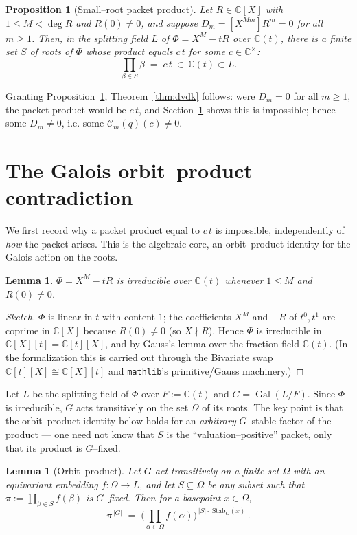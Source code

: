 \documentclass[11pt,reqno]{amsart}
\theoremstyle{plain}
\newtheorem{lemma}[theorem]{Lemma}
\newtheorem{proposition}[theorem]{Proposition}
\theoremstyle{definition}
\newcommand{\C}{\mathbb{C}}
\newcommand{\Gal}{\operatorname{Gal}}
\begin{document}
\begin{proposition}[Small--root packet product]\label{prop:crux}
Let $R\in\C[X]$ with $1\le M<\deg R$ and $R(0)\ne0$, and suppose $D_m=[X^{Mm}]R^m=0$ for all $m\ge1$.
Then, in the splitting field $L$ of $\Phi=X^M-tR$ over $\C(t)$, there is a finite set $S$ of roots of
$\Phi$ whose product equals $c\,t$ for some $c\in\C^\times$:
\[
  \prod_{\beta\in S}\beta \;=\; c\,t\ \in\ \C(t)\subset L.
\]
\end{proposition}

Granting Proposition~\ref{prop:crux}, Theorem~\ref{thm:dvdk} follows: were $D_m=0$ for all $m\ge1$, the
packet product would be $c\,t$, and Section~\ref{sec:orbit} shows this is impossible; hence some
$D_m\ne0$, i.e. some $\mathcal C_m(q)(c)\ne0$.

\section{The Galois orbit--product contradiction}\label{sec:orbit}

We first record why a packet product equal to $c\,t$ is impossible, independently of \emph{how} the
packet arises. This is the algebraic core, an orbit--product identity for the Galois action on the
roots.

\begin{lemma}\label{lem:irred}
$\Phi=X^M-tR$ is irreducible over $\C(t)$ whenever $1\le M$ and $R(0)\ne0$.
\end{lemma}

\begin{proof}[Sketch]
$\Phi$ is linear in $t$ with content $1$; the coefficients $X^M$ and $-R$ of $t^0,t^1$ are coprime in
$\C[X]$ because $R(0)\ne0$ (so $X\nmid R$). Hence $\Phi$ is irreducible in $\C[X][t]=\C[t][X]$, and by
Gauss's lemma over the fraction field $\C(t)$. (In the formalization this is carried out through the
Bivariate swap $\C[t][X]\cong\C[X][t]$ and \texttt{mathlib}'s primitive/Gauss machinery.)
\end{proof}

Let $L$ be the splitting field of $\Phi$ over $F:=\C(t)$ and $G=\Gal(L/F)$. Since $\Phi$ is irreducible,
$G$ acts transitively on the set $\Omega$ of its roots. The key point is that the orbit--product
identity below holds for an \emph{arbitrary} $G$--stable factor of the product --- one need not know
that $S$ is the ``valuation--positive'' packet, only that its product is $G$--fixed.

\begin{lemma}[Orbit--product]\label{lem:orbit}
Let $G$ act transitively on a finite set $\Omega$ with an equivariant embedding $f\colon\Omega\to L$,
and let $S\subseteq\Omega$ be any subset such that $\pi:=\prod_{\beta\in S}f(\beta)$ is $G$--fixed. Then
for a basepoint $x\in\Omega$,
\[
  \pi^{\,|G|}\;=\;\Big(\prod_{\alpha\in\Omega} f(\alpha)\Big)^{\,|S|\cdot|\mathrm{Stab}_G(x)|}.
\]
\end{lemma}
\end{document}
